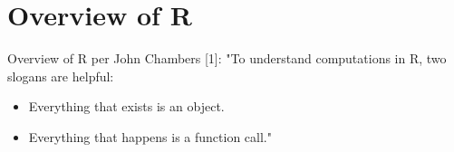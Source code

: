 \section{Overview of R}
\begin{frame}
	\begin{center}
  		\begin{block}{Overview of R per John Chambers [1]:} 
			"To understand computations in R, two slogans are helpful:
			\begin{itemize}
			        \item Everything that exists is an object.
			        \item Everything that happens is a function call."
			\end{itemize}
		\end{block}
	\end{center} 

\end{frame}

